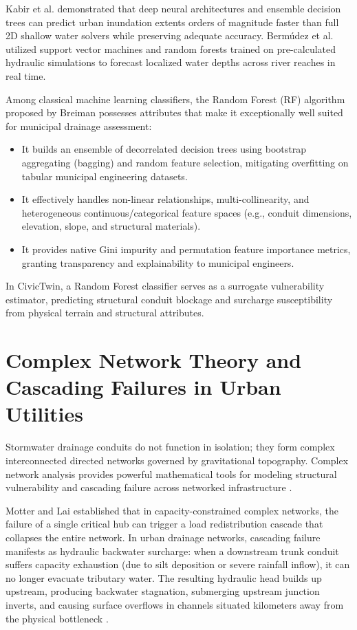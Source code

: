 \documentclass[12pt,a4paper]{report}
\begin{document}
Kabir et al. \cite{kabir2020deep} demonstrated that deep neural architectures and ensemble decision trees can predict urban inundation extents orders of magnitude faster than full 2D shallow water solvers while preserving adequate accuracy. Berm{\'u}dez et al. \cite{bermudez2018rapid} utilized support vector machines and random forests trained on pre-calculated hydraulic simulations to forecast localized water depths across river reaches in real time.

Among classical machine learning classifiers, the Random Forest (RF) algorithm proposed by Breiman \cite{breiman2001random} possesses attributes that make it exceptionally well suited for municipal drainage assessment:
\begin{itemize}
    \item It builds an ensemble of decorrelated decision trees using bootstrap aggregating (bagging) and random feature selection, mitigating overfitting on tabular municipal engineering datasets.
    \item It effectively handles non-linear relationships, multi-collinearity, and heterogeneous continuous/categorical feature spaces (e.g., conduit dimensions, elevation, slope, and structural materials).
    \item It provides native Gini impurity and permutation feature importance metrics, granting transparency and explainability to municipal engineers.
\end{itemize}
In CivicTwin, a Random Forest classifier serves as a surrogate vulnerability estimator, predicting structural conduit blockage and surcharge susceptibility from physical terrain and structural attributes.

\section{Complex Network Theory and Cascading Failures in Urban Utilities}
Stormwater drainage conduits do not function in isolation; they form complex interconnected directed networks governed by gravitational topography. Complex network analysis provides powerful mathematical tools for modeling structural vulnerability and cascading failure across networked infrastructure \cite{newman2018networks, yazdani2012complex}.

Motter and Lai \cite{motter2002cascade} established that in capacity-constrained complex networks, the failure of a single critical hub can trigger a load redistribution cascade that collapses the entire network. In urban drainage networks, cascading failure manifests as hydraulic backwater surcharge: when a downstream trunk conduit suffers capacity exhaustion (due to silt deposition or severe rainfall inflow), it can no longer evacuate tributary water. The resulting hydraulic head builds up upstream, producing backwater stagnation, submerging upstream junction inverts, and causing surface overflows in channels situated kilometers away from the physical bottleneck \cite{yazdani2012complex}.
\end{document}
